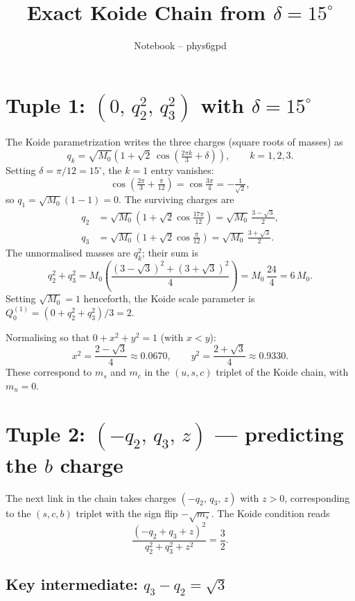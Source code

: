\documentclass[11pt]{article}
\title{Exact Koide Chain from $\delta=15^\circ$}
\author{Notebook -- phys6gpd}
\date{}
\begin{document}
\maketitle

\section{Tuple 1: $(0,\, q_2^2,\, q_3^2)$ with $\delta = 15^\circ$}

The Koide parametrization writes the three charges (square roots of masses) as
\[
  q_k = \sqrt{M_0}\!\left(1 + \sqrt{2}\,\cos\!\left(\tfrac{2\pi k}{3} + \delta\right)\right),
  \qquad k=1,2,3.
\]
Setting $\delta = \pi/12 = 15^\circ$, the $k\!=\!1$ entry vanishes:
\[
  \cos\!\left(\tfrac{2\pi}{3}+\tfrac{\pi}{12}\right)
  = \cos\tfrac{3\pi}{4} = -\tfrac{1}{\sqrt{2}},
\]
so $q_1 = \sqrt{M_0}(1-1)=0$.  The surviving charges are
\begin{align}
  q_2 &= \sqrt{M_0}\!\left(1+\sqrt{2}\cos\tfrac{17\pi}{12}\right)
       = \sqrt{M_0}\,\frac{3-\sqrt{3}}{2}, \\[4pt]
  q_3 &= \sqrt{M_0}\!\left(1+\sqrt{2}\cos\tfrac{\pi}{12}\right)
       = \sqrt{M_0}\,\frac{3+\sqrt{3}}{2}.
\end{align}
The unnormalised masses are $q_k^2$; their sum is
\[
  q_2^2 + q_3^2 = M_0\!\left(\frac{(3-\sqrt3)^2+(3+\sqrt3)^2}{4}\right)
  = M_0\,\frac{24}{4} = 6\,M_0.
\]
Setting $\sqrt{M_0}=1$ henceforth, the Koide scale parameter is
$Q_0^{(1)} = (0 + q_2^2 + q_3^2)/3 = 2$.

Normalising so that $0 + x^2 + y^2 = 1$ (with $x < y$):
\[
  \boxed{x^2 = \frac{2-\sqrt{3}}{4}\approx 0.0670,
  \qquad
  y^2 = \frac{2+\sqrt{3}}{4}\approx 0.9330.}
\]
These correspond to $m_s$ and $m_c$ in the $(u,s,c)$ triplet of the Koide chain,
with $m_u=0$.

\section{Tuple 2: $(-q_2,\, q_3,\, z)$ --- predicting the $b$ charge}

The next link in the chain takes charges $(-q_2,\,q_3,\,z)$ with $z>0$,
corresponding to the $(s,c,b)$ triplet with the sign flip $-\!\sqrt{m_s}$.
The Koide condition reads
\[
  \frac{(-q_2+q_3+z)^2}{q_2^2+q_3^2+z^2} = \frac{3}{2}.
\]

\subsection{Key intermediate: $q_3 - q_2 = \sqrt{3}$}
\end{document}
